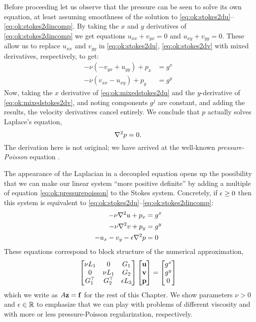 Before proceeding let us observe that the pressure can be seen to solve its own equation, at least assuming smoothness of the solution to \eqref{eq:ok:stokes2du}--\eqref{eq:ok:stokes2dincomp}.  By taking the $x$ and $y$ derivatives of \eqref{eq:ok:stokes2dincomp} we get equations $u_{xx} + v_{yx} = 0$ and $u_{xy} + v_{yy} = 0$.  These allow us to replace $u_{xx}$ and $v_{yy}$ in \eqref{eq:ok:stokes2du}, \eqref{eq:ok:stokes2dv} with mixed derivatives, respectively, to get:
\begin{align}
-\nu \left(-v_{yx} + u_{yy}\right) + p_x &= g^x \label{eq:ok:mixedstokes2du} \\
-\nu \left(v_{xx} - u_{xy}\right) + p_y &= g^y \label{eq:ok:mixedstokes2dv}
\end{align}
Now, taking the $x$ derivative of \eqref{eq:ok:mixedstokes2du} and the $y$-derivative of \eqref{eq:ok:mixedstokes2dv}, and noting components $g^j$ are constant, and adding the results, the velocity derivatives cancel entirely.  We conclude that $p$ actually solves Laplace's equation,
\begin{equation}
\nabla^2 p = 0. \label{eq:ok:pressurepoisson}
\end{equation}
The derivation here is not original; we have arrived at the well-known \emph{pressure-Poisson} equation \citep[FIXME: check]{Ockendonetal2003}.

The appearance of the Laplacian in a decoupled equation opens up the possibility that we can make our linear system ``more positive definite'' by adding a multiple of equation \eqref{eq:ok:pressurepoisson} to the Stokes system.  Concretely, if $\epsilon\ge 0$ then this system is equivalent to \eqref{eq:ok:stokes2du}--\eqref{eq:ok:stokes2dincomp}:
\begin{align}
-\nu \nabla^2 u + p_x &= g^x \label{eq:ok:ppstokes2du} \\
-\nu \nabla^2 v + p_y &= g^y \label{eq:ok:ppstokes2dv} \\
- u_x - v_y - \epsilon \nabla^2 p &= 0 \label{eq:ok:ppstokes2dincomp}
\end{align}
These equations correspond to block structure of the numerical approximation,
\begin{equation}
\begin{bmatrix}
    \nu L_1 & 0 & G_1 \\
    0 & \nu L_1 & G_2 \\
    G_1^\top & G_2^\top & \epsilon L_3
    \end{bmatrix}
    \begin{bmatrix}
    \mathbf{u} \\ \mathbf{v} \\ \mathbf{p}
    \end{bmatrix}
    =
    \begin{bmatrix}
    g^x \\ g^y \\ 0
    \end{bmatrix} \label{eq:ok:blockppstokes}
\end{equation}
which we write as $A\mathbf{z} = \mathbf{f}$ for the rest of this Chapter.  We show parameters $\nu>0$ and $\epsilon \in \mathbb{R}$ to emphasize that we can play with problems of different viscosity and with more or less pressure-Poisson regularization, respectively. 


